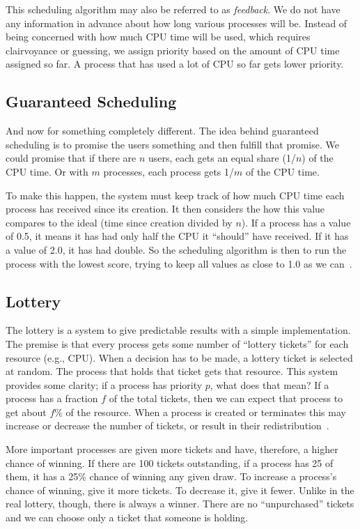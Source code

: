 This scheduling algorithm may also be referred to as \textit{feedback}. We do not have any information in advance about how long various processes will be. Instead of being concerned with how much CPU time will be used, which requires clairvoyance or guessing, we assign priority based on the amount of CPU time assigned so far. A process that has used a lot of CPU so far gets lower priority.

\subsection*{Guaranteed Scheduling}

And now for something completely different. The idea behind guaranteed scheduling is to promise the users something and then fulfill that promise. We could promise that if there are $n$ users, each gets an equal share (1/$n$) of the CPU time. Or with $m$ processes, each process gets 1/$m$ of the CPU time.

To make this happen, the system must keep track of how much CPU time each process has received since its creation. It then considers the how this value compares to the ideal (time since creation divided by $n$). If a process has a value of 0.5, it means it has had only half the CPU it ``should'' have received. If it has a value of 2.0, it has had double. So the scheduling algorithm is then to run the process with the lowest score, trying to keep all values as close to 1.0 as we can~\cite{mos}.

\subsection*{Lottery}

The lottery is a system to give predictable results with a simple implementation. The premise is that every process gets some number of ``lottery tickets'' for each resource (e.g., CPU). When a decision has to be made, a lottery ticket is selected at random. The process that holds that ticket gets that resource. This system provides some clarity; if a process has priority $p$, what does that mean? If a process has a fraction $f$ of the total tickets, then we can expect that process to get about $f$\% of the resource. When a process is created or terminates this may increase or decrease the number of tickets, or result in their redistribution~\cite{mos}. 

More important processes are given more tickets and have, therefore, a higher chance of winning. If there are 100 tickets outstanding, if a process has 25 of them, it has a 25\% chance of winning any given draw. To increase a process's chance of winning, give it more tickets. To decrease it, give it fewer. Unlike in the real lottery, though, there is always a winner. There are no ``unpurchased'' tickets and we can choose only a ticket that someone is holding.

